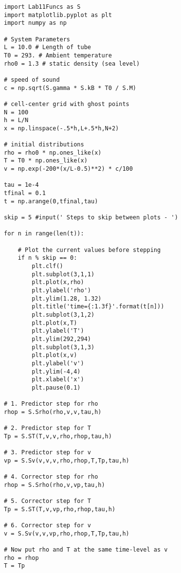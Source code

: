 \begin{lstlisting}
import Lab11Funcs as S
import matplotlib.pyplot as plt
import numpy as np

# System Parameters
L = 10.0 # Length of tube
T0 = 293. # Ambient temperature
rho0 = 1.3 # static density (sea level)

# speed of sound
c = np.sqrt(S.gamma * S.kB * T0 / S.M)

# cell-center grid with ghost points
N = 100
h = L/N
x = np.linspace(-.5*h,L+.5*h,N+2)

# initial distributions
rho = rho0 * np.ones_like(x)
T = T0 * np.ones_like(x)
v = np.exp(-200*(x/L-0.5)**2) * c/100

tau = 1e-4
tfinal = 0.1
t = np.arange(0,tfinal,tau)

skip = 5 #input(' Steps to skip between plots - ')

for n in range(len(t)):

	# Plot the current values before stepping
	if n % skip == 0:
		plt.clf()
		plt.subplot(3,1,1)
		plt.plot(x,rho)
		plt.ylabel('rho')
		plt.ylim(1.28, 1.32)
		plt.title('time={:1.3f}'.format(t[n]))
		plt.subplot(3,1,2)
		plt.plot(x,T)
		plt.ylabel('T')
		plt.ylim(292,294)
		plt.subplot(3,1,3)
		plt.plot(x,v)
		plt.ylabel('v')
		plt.ylim(-4,4)
		plt.xlabel('x')
		plt.pause(0.1)
		
# 1. Predictor step for rho
rhop = S.Srho(rho,v,v,tau,h)

# 2. Predictor step for T
Tp = S.ST(T,v,v,rho,rhop,tau,h)

# 3. Predictor step for v
vp = S.Sv(v,v,v,rho,rhop,T,Tp,tau,h)

# 4. Corrector step for rho
rhop = S.Srho(rho,v,vp,tau,h)

# 5. Corrector step for T
Tp = S.ST(T,v,vp,rho,rhop,tau,h)

# 6. Corrector step for v
v = S.Sv(v,v,vp,rho,rhop,T,Tp,tau,h)

# Now put rho and T at the same time-level as v
rho = rhop
T = Tp
\end{lstlisting}





